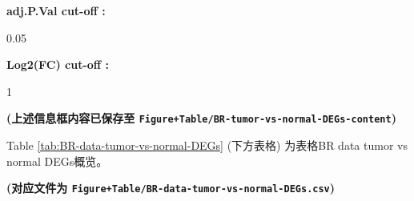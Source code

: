 \documentclass[
]{article}
\begin{document}
\begin{center}\vspace{1.5cm}\end{center}\begin{center}\begin{tcolorbox}[colback=gray!10, colframe=gray!50, width=0.9\linewidth, arc=1mm, boxrule=0.5pt]
\textbf{
adj.P.Val cut-off
:}

\vspace{0.5em}

    0.05

\vspace{2em}


\textbf{
Log2(FC) cut-off
:}

\vspace{0.5em}

    1

\vspace{2em}
\end{tcolorbox}
\end{center}

\textbf{(上述信息框内容已保存至 \texttt{Figure+Table/BR-tumor-vs-normal-DEGs-content})}

\begin{center}\vspace{1.5cm}\end{center}

Table \ref{tab:BR-data-tumor-vs-normal-DEGs} (下方表格) 为表格BR data tumor vs normal DEGs概览。

\textbf{(对应文件为 \texttt{Figure+Table/BR-data-tumor-vs-normal-DEGs.csv})}
\end{document}
